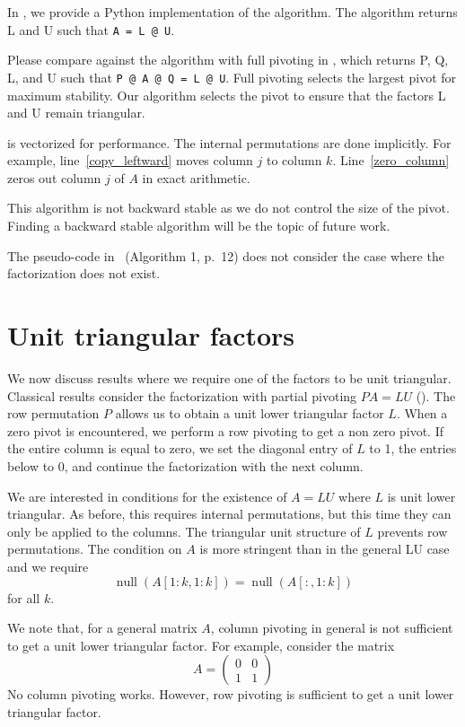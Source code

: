 \documentclass[10pt,twoside]{siamart1116}
\DeclareMathOperator{\nl}{null}
\numberwithin{theorem}{section}
\begin{document}
In , we provide a Python implementation of the algorithm. The algorithm returns L and U such that \verb|A = L @ U|.

Please compare against the algorithm with full pivoting in , which returns P, Q, L, and U such that \verb|P @ A @ Q = L @ U|. Full pivoting selects the largest pivot for maximum stability. Our algorithm selects the pivot to ensure that the factors L and U remain triangular.

 is vectorized for performance. The internal permutations are done implicitly. For example, line~\ref{copy_leftward} moves column $j$ to column $k$. Line~\ref{zero_column} zeros out column $j$ of $A$ in exact arithmetic.

This algorithm is not backward stable as we do not control the size of the pivot. Finding a backward stable algorithm will be the topic of future work.

The pseudo-code in~\cite{okunev_necessary_2005} (Algorithm 1, p.~12) does not consider the case where the factorization does not exist.

\section{Unit triangular factors}\label{sec:unit_triangular}

We now discuss results where we require one of the factors to be unit triangular. Classical results consider the factorization with partial pivoting $PA = LU$ (). The row permutation $P$ allows us to obtain a unit lower triangular factor $L$. When a zero pivot is encountered, we perform a row pivoting to get a non zero pivot. If the entire column is equal to zero, we set the diagonal entry of $L$ to 1, the entries below to 0, and continue the factorization with the next column.

We are interested in conditions for the existence of $A=LU$ where $L$ is unit lower triangular. As before, this requires internal permutations, but this time they can only be applied to the columns. The triangular unit structure of $L$ prevents row permutations. The condition on $A$ is more stringent than in the general LU case and we require
\[
	\nl(A[1:k,1:k]) = \nl(A[:,1:k])
\]
for all $k$.

We note that, for a general matrix $A$, column pivoting in general is not sufficient to get a unit lower triangular factor. For example, consider the matrix
\[
	A = \begin{pmatrix}
		0 & 0 \\
		1 & 1
	\end{pmatrix}
\]
No column pivoting works. However, row pivoting is sufficient to get a unit lower triangular factor.
\end{document}
